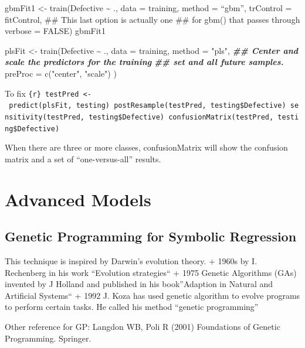\documentclass[
]{book}
\newenvironment{Shaded}{\begin{snugshade}}{\end{snugshade}}
\newcommand{\AttributeTok}[1]{\textcolor[rgb]{0.77,0.63,0.00}{#1}}
\newcommand{\DocumentationTok}[1]{\textcolor[rgb]{0.56,0.35,0.01}{\textbf{\textit{#1}}}}
\newcommand{\FunctionTok}[1]{\textcolor[rgb]{0.00,0.00,0.00}{#1}}
\newcommand{\NormalTok}[1]{#1}
\newcommand{\OtherTok}[1]{\textcolor[rgb]{0.56,0.35,0.01}{#1}}
\newcommand{\SpecialCharTok}[1]{\textcolor[rgb]{0.00,0.00,0.00}{#1}}
\newcommand{\StringTok}[1]{\textcolor[rgb]{0.31,0.60,0.02}{#1}}
\begin{document}
gbmFit1 \textless- train(Defective \textasciitilde{} ., data = training,
method = ``gbm'',
trControl = fitControl,
\#\# This last option is actually one
\#\# for gbm() that passes through
verbose = FALSE)
gbmFit1

\begin{Shaded}
\begin{Highlighting}[]
\NormalTok{plsFit }\OtherTok{\textless{}{-}} \FunctionTok{train}\NormalTok{(Defective }\SpecialCharTok{\textasciitilde{}}\NormalTok{ .,}
 \AttributeTok{data =}\NormalTok{ training,}
 \AttributeTok{method =} \StringTok{"pls"}\NormalTok{,}
 \DocumentationTok{\#\# Center and scale the predictors for the training}
 \DocumentationTok{\#\# set and all future samples.}
 \AttributeTok{preProc =} \FunctionTok{c}\NormalTok{(}\StringTok{"center"}\NormalTok{, }\StringTok{"scale"}\NormalTok{)}
\NormalTok{)}
\end{Highlighting}
\end{Shaded}

To fix \texttt{\{r\}\ testPred\ \textless{}-\ predict(plsFit,\ testing)\ postResample(testPred,\ testing\$Defective)\ sensitivity(testPred,\ testing\$Defective)\ confusionMatrix(testPred,\ testing\$Defective)}

When there are three or more classes, confusionMatrix will show the confusion matrix and a set of ``one-versus-all'' results.

\hypertarget{advanced-models}{%
\chapter{Advanced Models}\label{advanced-models}}

\hypertarget{genetic-programming-for-symbolic-regression}{%
\section{Genetic Programming for Symbolic Regression}\label{genetic-programming-for-symbolic-regression}}

This technique is inspired by Darwin's evolution theory.
+ 1960s by I. Rechenberg in his work ``Evolution strategies``
+ 1975 Genetic Algorithms (GAs) invented by J Holland and published in his book''Adaption in Natural and Artificial Systems``
+ 1992 J. Koza has used genetic algorithm to evolve programs to perform certain tasks. He called his method ``genetic programming''

Other reference for GP: Langdon WB, Poli R (2001) Foundations of Genetic Programming. Springer.
\end{document}
